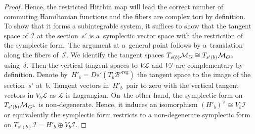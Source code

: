 \documentclass[pdftex]{sigma}
\numberwithin{equation}{section}
\theoremstyle{definition}
\newcommand{\reg}{\mathrm{reg}}
\newcommand{\calB}{\mathcal{B}}
\newcommand{\calI}{\mathcal{I}}
\newcommand{\calL}{\mathcal{L}}
\newcommand{\calM}{\mathcal{M}}
\begin{document}
\begin{proof}
 Hence, the restricted Hitchin map will lead the correct number of commuting Hamiltonian functions and the fibers are complex tori by definition. To show that it forms a subintegrable system, it suffices to show that the tangent space of $\calI$ at the section~$s'$ is a~symplectic vector space with the restriction of the symplectic form. The argument at a~general point follows by a~translation along the fibers of~$\calI$. We identify the tangent spaces $T_{s(b)}\calM_G \cong T_{s'(b)}\calM_{G^{\rm L}}$ using~$\delta$. Then the vertical tangent spaces to $V\calL$ and $V\calI$ are complementary by definition. Denote by~$H'_b=Ds'(T_b\calB'^\reg)$ the tangent space to the image of the section~$s'$ at~$b$. Tangent vectors in~$H'_b$~pair to zero with the vertical tangent vectors in $V_b\calL$ as $\calL$ is Lagrangian. On~the other hand, the symplectic form on $T_{s'(b)}\calM_{G^{\rm L}}$ is non-degenerate. Hence, it induces an isomorphism $(H'_b)^\vee \cong V_b\calI$ or equivalently the symplectic form restricts to a non-degenerate symplectic form on $T_{s'(b)} \calI=H'_b \oplus V_b \calI$.
\end{proof}
\end{document}
